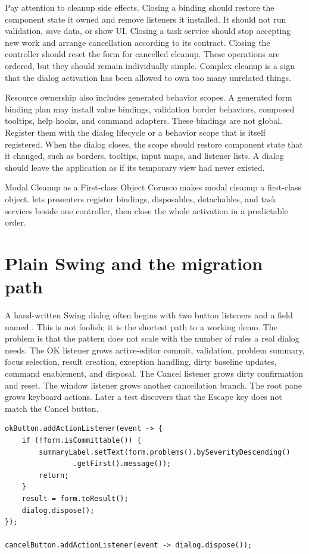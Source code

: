 Pay attention to cleanup side effects. Closing a binding should restore the
component state it owned and remove listeners it installed. It should not run
validation, save data, or show UI. Closing a task service should stop accepting
new work and arrange cancellation according to its contract. Closing the
controller should reset the form for cancelled cleanup. These operations are
ordered, but they should remain individually simple. Complex cleanup is a sign
that the dialog activation has been allowed to own too many unrelated things.

Resource ownership also includes generated behavior scopes. A generated form
binding plan may install value bindings, validation border behaviors, composed
tooltips, help hooks, and command adapters. These bindings are not global.
Register them with the dialog lifecycle or a behavior scope that is itself
registered. When the dialog closes, the scope should restore component state
that it changed, such as borders, tooltips, input maps, and listener lists. A
dialog should leave the application as if its temporary view had never existed.

\begin{coruscobox}{Modal Cleanup as a First-class Object}
Corusco makes modal cleanup a first-class object. 
lets presenters register bindings, disposables, detachables, and task services
beside one controller, then close the whole activation in a predictable order.
\end{coruscobox}

\section{Plain Swing and the migration path}

A hand-written Swing dialog often begins with two button listeners and a field
named . This is not foolish; it is the shortest path to a working
demo. The problem is that the pattern does not scale with the number of rules a
real dialog needs. The OK listener grows active-editor commit, validation,
problem summary, focus selection, result creation, exception handling, dirty
baseline updates, command enablement, and disposal. The Cancel listener grows
dirty confirmation and reset. The window listener grows another cancellation
branch. The root pane grows keyboard actions. Later a test discovers that the
Escape key does not match the Cancel button.

\begin{lstlisting}[caption={Typical handwritten OK/Cancel drift.}]
okButton.addActionListener(event -> {
    if (!form.isCommittable()) {
        summaryLabel.setText(form.problems().bySeverityDescending()
                .getFirst().message());
        return;
    }
    result = form.toResult();
    dialog.dispose();
});

cancelButton.addActionListener(event -> dialog.dispose());
\end{lstlisting}

